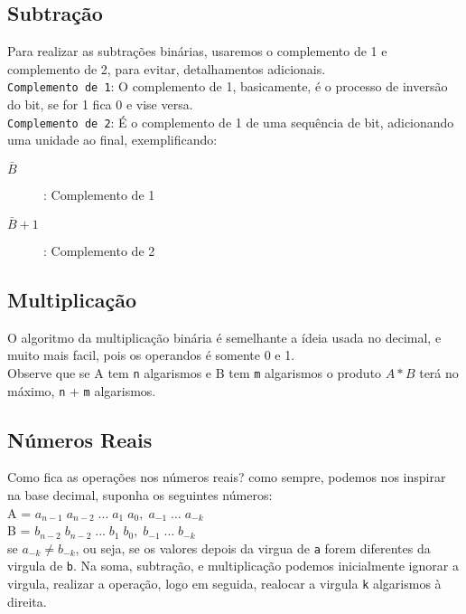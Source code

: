 \documentclass[12pt, onecolumn]{article}
\begin{document}
			\subsection{\centering Subtração}

	Para realizar as subtrações binárias, usaremos o complemento de 1 e complemento
	de 2, para evitar, detalhamentos adicionais.\\
	\newline
	\texttt{Complemento de 1}: O complemento de 1, basicamente, é o processo
	de inversão do bit, se for 1 fica 0 e vise versa.\\
	\newline
	\texttt{Complemento de 2}: É o complemento de 1 de uma sequência de bit,
	adicionando uma unidade ao final, exemplificando:
	
	\begin{description}
		\item[$\bar{B}$]: Complemento de 1
		\item[$\bar{B} + 1$]: Complemento de 2
	\end{description}

			\subsection{\centering Multiplicação}

	O algoritmo da multiplicação binária é semelhante a ídeia usada no decimal, 
	e muito mais facil, pois os operandos é somente 0 e 1.\\
	\newline
	Observe que se A tem \texttt{n} algarismos e B tem \texttt{m} algarismos
	o produto $A * B$ terá no máximo, \texttt{n} + \texttt{m} algarismos.
	
			\subsection{\centering Números Reais}

	Como fica as operações nos números reais? como sempre, podemos nos inspirar na
	base decimal, suponha os seguintes números: \\
	\newline
	A = $a_{n-1}\;a_{n-2}\;...\;a_1\;a_0,\;a_{-1}\;...\;a_{-k}$ \\
	B = $b_{n-2}\;b_{n-2}\;...\;b_1\;b_0,\;b_{-1}\;...\;b_{-k}$ \\
	\newline
	se $a_{-k} \ne b_{-k}$, ou seja, se os valores depois da virgua de \texttt{a} 
	forem diferentes da virgula de \texttt{b}. Na soma, subtração, e multiplicação
	podemos	inicialmente ignorar a virgula, realizar a operação, logo em seguida, 
	realocar a virgula \texttt{k} algarismos à direita.
\end{document}
